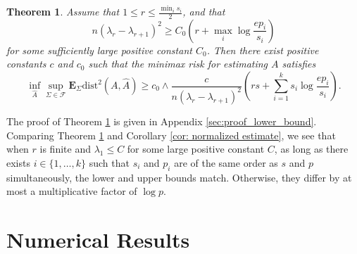 \documentclass[11pt]{article}
\newcommand{\dist}{\mathrm{dist}}
\newcommand{\0}{{\mathbf{0}}}
\newcommand{\E}{{\mathbf{E}}}
\newtheorem{theorem}{Theorem}[section]
\begin{document}
\begin{theorem}
\label{thm:lower_bound_gca}
Assume that $1\leq r \leq \frac{\min_i s_i}{2}$, and that \begin{equation}
    n(\lambda_r-\lambda_{r+1})^2\geq C_0\left(r+\max_i\log\frac{ep_i}{s_i}\right)
    \label{eq:lower_bound_condition}
\end{equation}
for some sufficiently large positive constant $C_0$. Then there exist positive constants $c$ and $c_0$ such that the minimax risk for estimating $A$ satisfies\begin{equation}
    \inf_{\widehat{A}}\sup_{\Sigma\in\mathcal{F}} \E_\Sigma \dist^2(A, \widehat{A})\geq c_0 \wedge  \frac{c}{n(\lambda_r-\lambda_{r+1})^2}\left(rs+\sum_{i=1}^k s_i\log\frac{ep_i}{s_i}\right).    \label{eq:lower_bound}
\end{equation}
\end{theorem}

The proof of Theorem \ref{thm:lower_bound_gca} is given in Appendix \ref{sec:proof_lower_bound}. 
Comparing Theorem \ref{thm:lower_bound_gca} and Corollary \ref{cor: normalized estimate}, we see that when $r$ is finite and $\lambda_1\leq C$ for some large positive constant $C$, as long as there exists $i\in \{1,\dots, k\}$ such that $s_i$ and $p_i$ are of the same order as $s$ and $p$ simultaneously, the lower and upper bounds match.
Otherwise, they differ by at most a multiplicative factor of $\log p$.




\section{Numerical Results}
\end{document}
